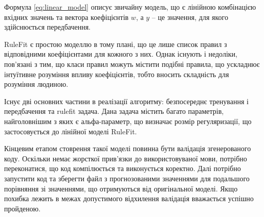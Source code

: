 Формула \ref{eq:linear_model} описує звичайну модель, що є лінійною комбінацією вхідних значень та вектора коефіцієнтів $w$, а  $y$ – це значення, для якого здійснюється передбачення.

RuleFit є простою моделлю в тому плані, що це лише список правил з відповідними коефіцієнтами для кожного з них. Однак існують і недоліки, пов'язані з тим, що класи правил можуть містити подібні правила, що ускладнює інтуїтивне розуміння впливу коефіцієнтів, тобто вносить складність для розуміння людиною.

Існує дві основних частини в реалізації алгоритму: безпосереднє тренування і передбачення та rulefit задача. Дана задача містить багато параметрів, найголовнішим з яких є альфа-параметр, що визначає розмір регуляризації, що застосовується до лінійної моделі RuleFit.

Кінцевим етапом стоврення такої моделі повинна бути валідація згенерованого коду. Оскільки немає жорсткої прив’язки до використовуваної мови, потрібно переконатися, що код компілюється та виконується коректно. Далі потрібно запустити код та зберегти файл з прогнозованими значеннями для подальшого порівняння зі значеннями, що отримуються від оригінальної моделі. Якщо похибка лежить в межах допустимого відхилення валідація вважається успішно пройденою.


